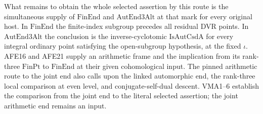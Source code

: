 What remains to obtain the whole selected assertion by this route is
the simultaneous supply of $\mathrm{FinEnd}$ and $\mathrm{AutEnd3Alt}$
at that mark for every original host. In $\mathrm{FinEnd}$ the
finite-index subgroup precedes all residual DVR points. In
$\mathrm{AutEnd3Alt}$ the conclusion is the inverse-cyclotomic
$\mathrm{IsAutCsdA}$ for every integral ordinary point satisfying the
open-subgroup hypothesis, at the fixed $\iota$. AFE16 and AFE21
supply an arithmetic frame and the implication from its rank-three
$\mathrm{FinPt}$ to $\mathrm{FinEnd}$ at their given cohomological
input. The pinned arithmetic route to the joint end also calls upon
the linked automorphic end, the rank-three local comparison at even
level, and conjugate-self-dual descent. VMA1--6 establish the
comparison from the joint end to the literal selected assertion;
the joint arithmetic end remains an input.
